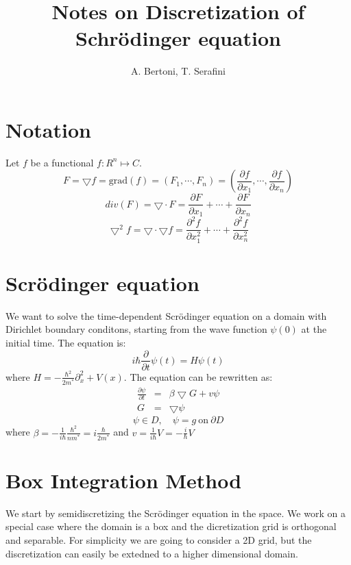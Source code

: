 \documentclass[a4paper,10pt]{article}
\title{Notes on Discretization of Schr\"{o}dinger equation}
\author{A. Bertoni, T. Serafini}
\begin{document}
\maketitle

\begin{abstract}

\end{abstract}

\section{Notation}
Let $f$ be a functional $f:R^n\mapsto C$.
$$ F = \bigtriangledown f = \mbox{grad}(f) = (F_1, \cdots, F_n) =
  \left( \frac{\partial f}{\partial x_1}, \cdots, \frac{\partial f}{\partial x_n} \right) $$
$$ div(F) = \bigtriangledown \cdot F = \frac{\partial F}{\partial x_1} + \cdots + \frac{\partial F}{\partial x_n} $$
$$ \bigtriangledown^2 f = \bigtriangledown \cdot \bigtriangledown f =
    \frac{\partial^2 f}{\partial x_1^2} + \cdots + \frac{\partial^2 f}{\partial x_n^2} $$

\section{Scr\"{o}dinger equation}
We want to solve the time-dependent Scr\"{o}dinger equation on a domain with Dirichlet boundary conditons, starting from the wave function $\psi(0)$ at the initial time. The equation is:
$$ i \hbar \frac{\partial}{\partial t} \psi(t) = H \psi(t) $$
where $ H = - \frac{\hbar^2}{2m^*}\partial_x^2 + V(x) $.
The equation can be rewritten as:
\begin{eqnarray}
\frac{\partial \psi}{\partial t} & = & \beta \bigtriangledown G + v\psi \\
G & = & \bigtriangledown \psi
\end{eqnarray}
$$ \psi \in D, \quad \psi = g \ \mbox{on} \ \partial D $$
where $\beta = - \frac{1}{i \hbar} \frac{\hbar^2}{nm^*} = i \frac{\hbar}{2m^*} $
and $ v = \frac{1}{i \hbar} V = -\frac{i}{\hbar}V $

\section{Box Integration Method}
We start by semidiscretizing the Scr\"{o}dinger equation in the space. We work on a special case where the domain is a box and the dicretization grid is orthogonal and separable. For simplicity we are going to consider a 2D grid, but the discretization can easily be extedned to a higher dimensional domain.
\end{document}
